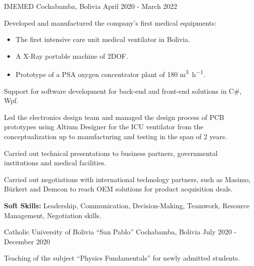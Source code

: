 \begin{cventries}
    {IMEMED}
    {Cochabamba, Bolivia}
    {April 2020 - March 2022}
    {
      \begin{cvitems}
        \item Developed and manufactured the company's first medical
        equipments:
        \begin{itemize}
          \item[\checkmark] The first intensive care unit medical
          ventilator in Bolivia.
          \item[\checkmark] A X-Ray portable machine of 2DOF.
          \item[\checkmark] Prototype of a PSA oxygen concentrator
          plant of 180 \unit{m^{3}.h^{-1}}.
        \end{itemize}
        \item Support for software development for back-end and
        front-end solutions in C\#, Wpf.
        \item Led the electronics design team and managed the design
        process of PCB prototypes using Altium Designer for the ICU
        ventilator from the conceptualization up to manufacturing and
        testing in the span of 2 years.
        \item Carried out technical presentations to business
        partners, governmental institutions and medical facilities.
        \item Carried out negotiations with international technology
        partners, such as Masimo, B\"urkert and Demcon to reach OEM
        solutions for product acquisition deals.
        \item \textbf{Soft Skills:} Leadership, Communication,
        Decision-Making, Teamwork, Resource Management, Negotiation
        skills.
      \end{cvitems}
    }

    {Catholic University of Bolivia ``San Pablo''}
    {Cochabamba, Bolivia}
    {July 2020 - December 2020}
    {
      \begin{cvitems}
        \item Teaching of the subject ``Physics Fundamentals'' for
        newly admitted students.
      \end{cvitems}
    }


\end{cventries}
